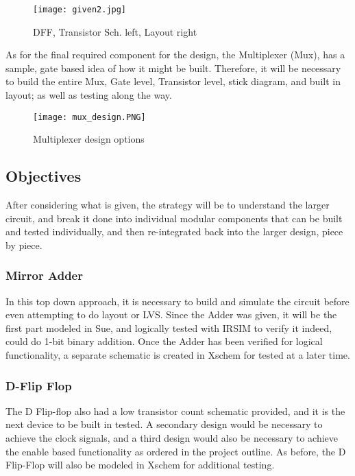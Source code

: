 \documentclass{article}
\begin{document}
\begin{figure}[H]
    \centering
    \texttt{[image: given2.jpg]}
    \caption{DFF, Transistor Sch. left, Layout right }
    \label{fig:given2}
\end{figure}


As for the final required component for the design, the Multiplexer (Mux), has a sample, gate based idea of how it might be built. Therefore, it will be necessary to build the entire Mux, Gate level, Transistor level, stick diagram, and built in layout; as well as testing along the way.

\begin{figure}[H]
    \centering
    \texttt{[image: mux\_design.PNG]}
    \caption{Multiplexer design options}
    \label{fig:given3}
\end{figure}
 
\subsection{Objectives}

After considering what is given, the strategy will be to understand the larger circuit, and break it done into individual modular components that can be built and tested individually, and then re-integrated back into the larger design, piece by piece. 
\newline
\subsubsection{Mirror Adder}
In this top down approach, it is necessary to build and simulate the circuit before even attempting to do layout or LVS. Since the Adder was given, it will be the first part modeled in Sue, and logically tested with IRSIM to verify it indeed, could do 1-bit binary addition.
\newline
Once the Adder has been verified for logical functionality, a separate schematic is created in Xschem for tested at a later time.
\newline
\subsubsection{D-Flip Flop}

The D Flip-flop also had a low transistor count schematic provided, and it is the next device to be built in tested. A secondary design would be necessary to achieve the clock signals, and a third design would also be necessary to achieve the enable based functionality as ordered in the project outline.
\newline 
As before, the D Flip-Flop will also be modeled in Xschem for additional testing.
\end{document}
